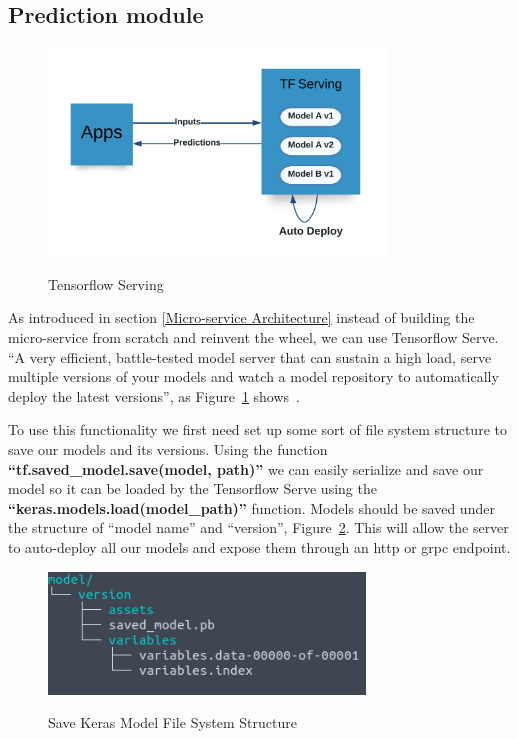 \newpage
\subsection{Prediction module}
\label{prediction-module}

\begin{figure}[h]
    \centering
    \caption{Tensorflow Serving}
    \includegraphics[width=0.8\textwidth]{figures/serving.png}
    \label{fig:serving}
\end{figure}

As introduced in section \ref{Micro-service Architecture} instead of building the micro-service from scratch and reinvent the wheel, we can use Tensorflow Serve. \enquote{A very efficient, battle-tested model server that can sustain a high load, serve multiple versions of your models and watch a model repository to automatically deploy the latest versions}, as Figure~\ref{fig:serving} shows~\cite{handsOnMachine}.

To use this functionality we first need set up some sort of file system structure to save our models and its versions. Using the function \textbf{\enquote{tf.saved\_model.save(model, path)}} we can easily serialize and save our model so it can be loaded by the Tensorflow Serve using the \textbf{\enquote{keras.models.load(model\_path)}} function. Models should be saved under the structure of \enquote{model name} and \enquote{version}, Figure~\ref{fig:model-save}. This will allow the server to auto-deploy all our models and expose them through an \gls{http} or \gls{grpc} endpoint.

\begin{figure}[h]
    \centering
    \caption{Save Keras Model File System Structure}
    \includegraphics[width=0.75\textwidth]{figures/model-save.png}
    \label{fig:model-save}
\end{figure}

